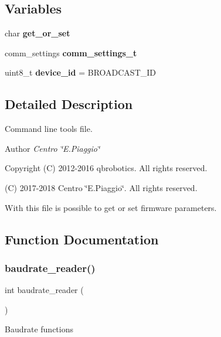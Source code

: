 \subsection*{Variables}
\begin{DoxyCompactItemize}
\item 
\mbox{\label{qbparam_8c_a3c28322a1b5922f8c61d7cb3723b56b1}} 
char {\bfseries get\+\_\+or\+\_\+set}
\item 
\mbox{\label{qbparam_8c_a92153f4b70cd8ba4e9b502ccff8d28bf}} 
comm\+\_\+settings {\bfseries comm\+\_\+settings\+\_\+t}
\item 
\mbox{\label{qbparam_8c_aebf6cf4331fcc15f0d3ed0890e01a380}} 
uint8\+\_\+t {\bfseries device\+\_\+id} = B\+R\+O\+A\+D\+C\+A\+S\+T\+\_\+\+ID
\end{DoxyCompactItemize}


\subsection{Detailed Description}
Command line tools file. 

\begin{DoxyAuthor}{Author}
{\itshape Centro \char`\"{}\+E.\+Piaggio\char`\"{}} 
\end{DoxyAuthor}
\begin{DoxyCopyright}{Copyright}
(C) 2012-\/2016 qbrobotics. All rights reserved. 

(C) 2017-\/2018 Centro \char`\"{}\+E.\+Piaggio\char`\"{}. All rights reserved.
\end{DoxyCopyright}
With this file is possible to get or set firmware parameters. 

\subsection{Function Documentation}
\mbox{\label{qbparam_8c_a872d84bb02f7d8f4617246f0c6d37c43}} 
\subsubsection{baudrate\+\_\+reader()}
{\footnotesize\ttfamily int baudrate\+\_\+reader (\begin{DoxyParamCaption}{ }\end{DoxyParamCaption})}

Baudrate functions 